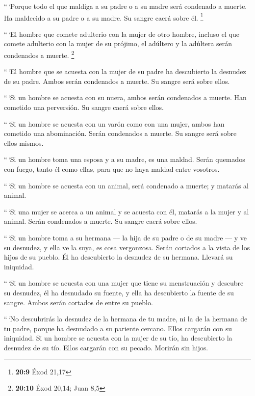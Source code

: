  ``\,`Porque todo el que maldiga a su padre o a su madre
será condenado a muerte. Ha maldecido a su padre o a su madre. Su sangre
caerá sobre él. \footnote{\textbf{20:9} Éxod 21,17}

 ``\,`El hombre que comete adulterio con la mujer de otro
hombre, incluso el que comete adulterio con la mujer de su prójimo, el
adúltero y la adúltera serán condenados a muerte. \footnote{\textbf{20:10}
  Éxod 20,14; Juan 8,5}

 ``\,`El hombre que se acuesta con la mujer de su padre
ha descubierto la desnudez de su padre. Ambos serán condenados a muerte.
Su sangre será sobre ellos.

 ``\,`Si un hombre se acuesta con su nuera, ambos serán
condenados a muerte. Han cometido una perversión. Su sangre caerá sobre
ellos.

 ``\,`Si un hombre se acuesta con un varón como con una
mujer, ambos han cometido una abominación. Serán condenados a muerte. Su
sangre será sobre ellos mismos.

 ``\,`Si un hombre toma una esposa y a su madre, es una
maldad. Serán quemados con fuego, tanto él como ellas, para que no haya
maldad entre vosotros.

 ``\,`Si un hombre se acuesta con un animal, será
condenado a muerte; y matarás al animal.

 ``\,`Si una mujer se acerca a un animal y se acuesta con
él, matarás a la mujer y al animal. Serán condenados a muerte. Su sangre
caerá sobre ellos.

 ``\,`Si un hombre toma a su hermana --- la hija de su
padre o de su madre --- y ve su desnudez, y ella ve la suya, es cosa
vergonzosa. Serán cortados a la vista de los hijos de su pueblo. Él ha
descubierto la desnudez de su hermana. Llevará su iniquidad.

 ``\,`Si un hombre se acuesta con una mujer que tiene su
menstruación y descubre su desnudez, él ha desnudado su fuente, y ella
ha descubierto la fuente de su sangre. Ambos serán cortados de entre su
pueblo.

 ``\,`No descubrirás la desnudez de la hermana de tu
madre, ni la de la hermana de tu padre, porque ha desnudado a su
pariente cercano. Ellos cargarán con su iniquidad.  Si un
hombre se acuesta con la mujer de su tío, ha descubierto la desnudez de
su tío. Ellos cargarán con su pecado. Morirán sin hijos.

